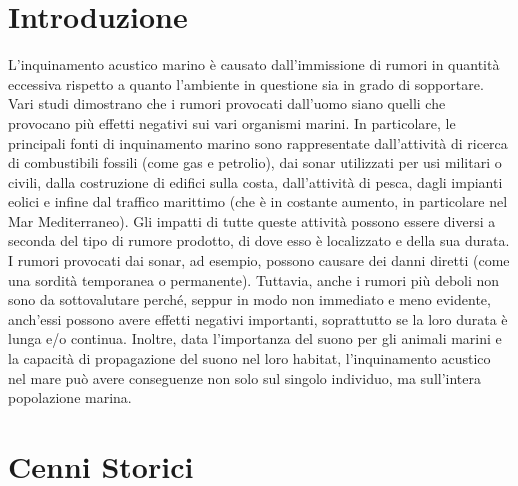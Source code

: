 
\chapter{Introduzione}

L’inquinamento acustico marino è causato dall’immissione di rumori in quantità eccessiva rispetto a quanto l’ambiente in questione sia in grado di sopportare. Vari studi dimostrano che i rumori provocati dall’uomo siano quelli che provocano più effetti negativi sui vari organismi marini. In particolare, le principali fonti di inquinamento marino sono rappresentate dall’attività di ricerca di combustibili fossili (come gas e petrolio), dai sonar utilizzati per usi militari o civili, dalla costruzione di edifici sulla costa, dall’attività di pesca, dagli impianti eolici e infine dal traffico marittimo (che è in costante aumento, in particolare nel Mar Mediterraneo).
Gli impatti di tutte queste attività possono essere diversi a seconda del tipo di rumore prodotto, di dove esso è localizzato e della sua durata. I rumori provocati dai sonar, ad esempio, possono causare dei danni diretti (come una sordità temporanea o permanente). Tuttavia, anche i rumori più deboli non sono da sottovalutare perché, seppur in modo non immediato e meno evidente, anch’essi possono avere effetti negativi importanti, soprattutto se la loro durata è lunga e/o continua. Inoltre, data l’importanza del suono per gli animali marini e la capacità di propagazione del suono nel loro habitat, l’inquinamento acustico nel mare può avere conseguenze non solo sul singolo individuo, ma sull’intera popolazione marina.
\chapter{Cenni Storici}
